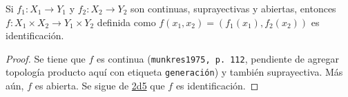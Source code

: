 

\begin{proposition}
Si $f_1 : X_1 \longrightarrow Y_1$ y $f_2 : X_2 \longrightarrow Y_2$ son continuas, suprayectivas y abiertas, entonces $f : X_1 \times X_2 \longrightarrow Y_1 \times Y_2$ definida como $f(x_1, x_2) = (f_1(x_1), f_2(x_2))$ es identificación.
\end{proposition}

\begin{proof}
Se tiene que $f$ es continua (\texttt{munkres1975, p. 112}, pendiente de agregar topología producto aquí con etiqueta \texttt{generación}) y también suprayectiva. Más aún, $f$ es abierta. Se sigue de \hyperref[card:2d5]{\textsf{2d5}} que $f$ es identificación.
\end{proof}
